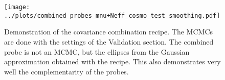 \documentclass[../main.tex]{subfiles}
\begin{document}
\begin{figure}
    \centering
    \texttt{[image: ../plots/combined\_probes\_mnu+Neff\_cosmo\_test\_smoothing.pdf]}
    \label{fig:combining-probes}
    \caption{Demonstration of the covariance combination recipe. The MCMCs are done with the settings of the Validation section. The combined probe is not an MCMC, but the ellipses from the Gaussian approximation obtained with the recipe. This also demonstrates very well the complementarity of the \Euclid probes.}
\end{figure}
\end{document}
